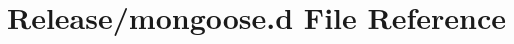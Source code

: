 \hypertarget{Release_2mongoose_8d}{}\section{Release/mongoose.d File Reference}
\label{Release_2mongoose_8d}
